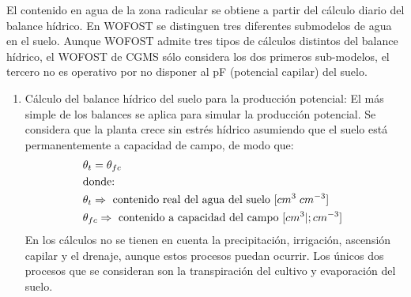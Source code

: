 El contenido en agua de la zona radicular se obtiene a partir del cálculo diario del balance hídrico. En WOFOST se distinguen tres diferentes submodelos de agua en el suelo. Aunque WOFOST admite tres tipos de cálculos distintos del balance hídrico, el WOFOST de CGMS sólo considera los dos primeros sub-modelos, el tercero no es operativo por no disponer al pF (potencial capilar) del suelo.
\begin{enumerate}
	\item Cálculo del balance hídrico del suelo para la producción potencial: El más simple de los balances se aplica para simular la producción potencial. Se considera que la planta crece sin estrés hídrico asumiendo que el suelo está permanentemente a capacidad de campo, de modo que:
	\begin{align*}
		&\theta_t=\theta_{fc} \\
		&\text{donde: } \\
		&\theta_t  \Rightarrow \text{ contenido real del agua del suelo [$ cm^3 \; cm^{-3} $] } \\
		&\theta_{fc}  \Rightarrow \text{ contenido a capacidad del campo [$ cm^3 |; cm^{-3} $] } \\
	\end{align*}
	En los cálculos no se tienen en cuenta la precipitación, irrigación, ascensión capilar y el drenaje, aunque estos procesos puedan ocurrir. Los únicos dos procesos que se consideran son la transpiración del cultivo y evaporación del suelo.
	

\end{enumerate}
